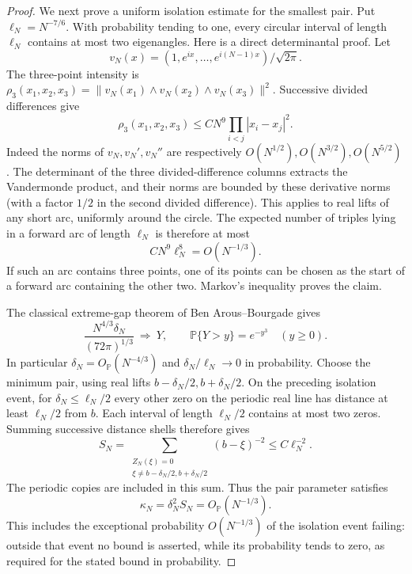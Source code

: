 \begin{proof}
We next prove a uniform isolation estimate for the
smallest pair. Put $\ell_N=N^{-7/6}$. With probability
tending to one, every circular interval of length
$\ell_N$ contains at most two eigenangles.
Here is a direct determinantal proof. Let
\[
 v_N(x)=(1,e^{ix},\ldots,e^{i(N-1)x})/\sqrt{2\pi}.
\]
The three-point intensity is
$\rho_3(x_1,x_2,x_3)=
 \|v_N(x_1)\wedge v_N(x_2)\wedge v_N(x_3)\|^2$.
Successive divided differences give
\[
 \rho_3(x_1,x_2,x_3)
       \le C N^9\prod_{i<j}|x_i-x_j|^2.
\]
Indeed the norms of $v_N,v_N',v_N''$ are respectively
$O(N^{1/2}),O(N^{3/2}),O(N^{5/2})$. The determinant
of the three divided-difference columns extracts the
Vandermonde product, and their norms are bounded by
these derivative norms (with a factor $1/2$ in the
second divided difference). This applies to real
lifts of any short arc, uniformly around the circle.
The expected number of triples lying in a forward
arc of length $\ell_N$ is therefore at most
\[
 C N^9\ell_N^8=O(N^{-1/3}).
\]
If such an arc contains three points, one of its points
can be chosen as the start of a forward arc containing
the other two. Markov's inequality proves the claim.

The classical extreme-gap theorem of Ben Arous--Bourgade
gives
\begin{equation}\label{eq:analytic-CUE-min-gap}
 \frac{N^{4/3}\delta_N}{(72\pi)^{1/3}}
          \ \Longrightarrow\ Y,\qquad
                    \mathbb P\{Y>y\}=e^{-y^3}\quad(y\ge0).
\end{equation}
In particular $\delta_N=O_{\mathbb P}(N^{-4/3})$ and
$\delta_N/\ell_N\to0$ in probability.
Choose the minimum pair, using real lifts
$b-\delta_N/2,b+\delta_N/2$. On the preceding isolation
event, for $\delta_N\le\ell_N/2$ every other zero on the
periodic real line has distance at least $\ell_N/2$
from $b$. Each interval of length $\ell_N/2$ contains
at most two zeros. Summing successive distance shells
therefore gives
\[
 S_N=\sum_{\substack{Z_N(\xi)=0\\
                   \xi\ne b-\delta_N/2,b+\delta_N/2}}
                     (b-\xi)^{-2}
                          \le C\ell_N^{-2}.
\]
The periodic copies are included in this sum. Thus the
pair parameter satisfies
\[
                    \kappa_N=\delta_N^2S_N
                             =O_{\mathbb P}(N^{-1/3}).
\]
This includes the exceptional probability
$O(N^{-1/3})$ of the isolation event failing:
outside that event no bound is asserted, while its
probability tends to zero, as required for the stated
bound in probability.


\end{proof}
